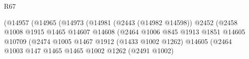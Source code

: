 \begin{lexlean}{R67}
\begin{coremodule}
                                                              (@14957
                                                                (@14965
                                                                  (@14973
                                                                    (@14981
                                                                      (@2443 (@14982 @14598))
                                                                      @2452
                                                                      (@2458
                                                                        @1008
                                                                        @1915
                                                                        @1465
                                                                        @14607
                                                                        @14608
                                                                        (@2464
                                                                          @1006
                                                                          @845
                                                                          @1913
                                                                          @1851
                                                                          @14605
                                                                          @10709
                                                                          (@2474
                                                                            @1005
                                                                            @1467
                                                                            @1912
                                                                            (@1433 @1002 @1262)
                                                                            @14605
                                                                            (@2464
                                                                              @1003
                                                                              @147
                                                                              @1465
                                                                              @1465
                                                                              @1002
                                                                              @1262
                                                                              (@2491 @1002)

\end{coremodule}
\end{lexlean}

